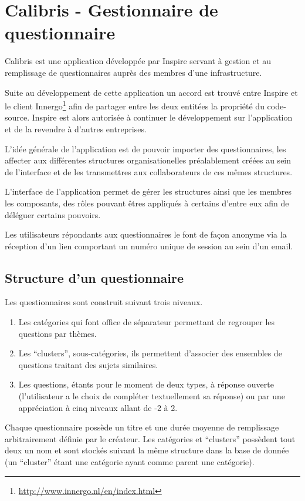 \documentclass[12pt,a4paper]{book}
\begin{document}
\section{Calibris - Gestionnaire de questionnaire}

Calibris est une application développée par Inspire servant à gestion et au remplissage de questionnaires auprès des membres d'une infrastructure.

Suite au développement de cette application un accord est trouvé entre Inspire et le client Innergo\footnote{\url{http://www.innergo.nl/en/index.html}} afin de partager entre les deux entitées la propriété du code-source. Inspire est alors autorisée à continuer le développement sur l'application et de la revendre à d'autres entreprises.

L'idée générale de l'application est de pouvoir importer des questionnaires, les affecter aux différentes structures organisationelles préalablement créées au sein de l'interface et de les transmettres aux collaborateurs de ces mêmes structures. 

L'interface de l'application permet de gérer les structures ainsi que les membres les composants, des rôles pouvant êtres appliqués à certains d'entre eux afin de déléguer certains pouvoirs. 

Les utilisateurs répondants aux questionnaires le font de façon anonyme via la réception d'un lien comportant un numéro unique de session au sein d'un email.

\subsection{Structure d'un questionnaire}

Les questionnaires sont construit suivant trois niveaux. 

\begin{enumerate}
  \item Les catégories qui font office de séparateur permettant de regrouper les questions par thèmes.
  \item Les ``clusters'', sous-catégories, ils permettent d'associer des ensembles de questions traitant des sujets similaires.
  \item Les questions, étants pour le moment de deux types, à réponse ouverte (l'utilisateur a le choix de compléter textuellement sa réponse) ou par une appréciation à cinq niveaux allant de -2 à 2.
\end{enumerate}

Chaque questionnaire possède un titre et une durée moyenne de remplissage arbitrairement définie par le créateur. Les catégories et ``clusters'' possèdent tout deux un nom et sont stockés suivant la même structure dans la base de donnée (un ``cluster'' étant une catégorie ayant comme parent une catégorie).
\end{document}
